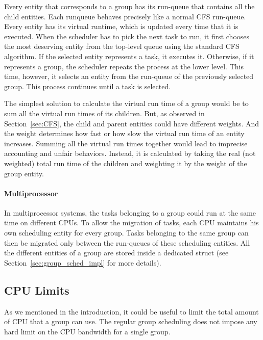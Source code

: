 Every entity that corresponds to a group has its run-queue that contains all the child entities. Each runqueue behaves precisely like a normal CFS run-queue.  Every entity has its virtual runtime, which is updated every time that it is executed. When the scheduler has to pick the next task to run, it first chooses the most deserving entity from the top-level queue using the standard CFS algorithm. If the selected entity represents a task, it executes it. Otherwise, if it represents a group, the scheduler repeats the process at the lower level. This time, however, it selects an entity from the run-queue of the previously selected group. This process continues until a task is selected.

The simplest solution to calculate the virtual run time of a group would be to sum all the virtual run times of its children. But, as observed in Section~\ref{sec:CFS}, the child and parent entities could have different weights. And the weight determines how fast or how slow the virtual run time of an entity increases. Summing all the virtual run times together would lead to imprecise accounting and unfair behaviors. Instead, it is calculated by taking the real (not weighted) total run time of the children and weighting it by the weight of the group entity.

\paragraph{Multiprocessor}
In multiprocessor systems, the tasks belonging to a group could run at the same time on different CPUs. To allow the migration of tasks, each CPU maintains his own scheduling entity for every group. Tasks belonging to the same group can then be migrated only between the run-queues of these scheduling entities. All the different entities of a group are stored inside a dedicated struct (see Section~\ref{sec:group_sched_impl} for more details).

\subsection{CPU Limits}
\label{sec:CPUlimits}

As we mentioned in the introduction, it could be useful to limit the total amount of CPU that a group can use. The regular group scheduling does not impose any hard limit on the CPU bandwidth for a single group. 

